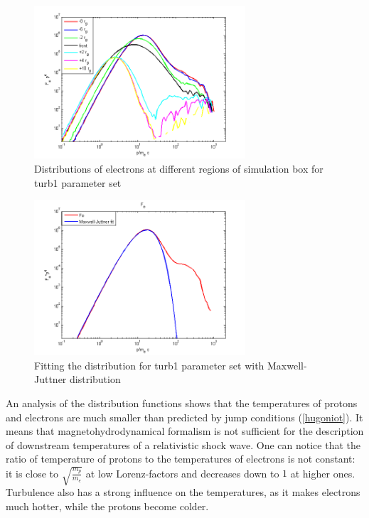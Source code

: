 \documentclass[a4paper]{jpconf}
\begin{document}
	\begin{figure}[h!]
		\centering
		\includegraphics[width=0.7\textwidth]{fig/electrons_at_points.png} 
		\caption{Distributions of electrons at different regions of simulation box for turb1 parameter set}
		\label{points}
	\end{figure}
	
	\begin{figure}[h!]
		\centering
		\includegraphics[width=0.7\textwidth]{fig/temperature_fit.png} 
		\caption{Fitting the distribution for turb1 parameter set with Maxwell-Juttner distribution}
		\label{temp_fit}
	\end{figure}
	
	An analysis of the distribution functions shows that the temperatures of protons and electrons are much smaller than predicted by jump conditions (\ref{hugoniot}). It means that magnetohydrodynamical formalism is not sufficient for the description of downstream temperatures of a relativistic shock wave. One can notice that the ratio of temperature of protons to the temperatures of electrons is not constant: it is close to $\sqrt{\frac{m_p}{m_e}}$ at low Lorenz-factors and decreases down to $1$ at higher ones. Turbulence also has a strong influence on the temperatures, as it makes electrons much hotter, while the protons become colder. 
	
\end{document}
